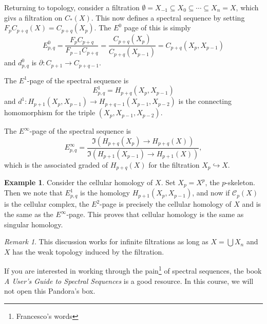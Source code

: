 \documentclass[leqno, openany]{memoir}
\theoremstyle{definition}
\newtheorem{exm}[thm]{Example}
\theoremstyle{remark}
\newtheorem{rmk}[thm]{Remark}
\theoremstyle{plain}
\theoremstyle{definition}
\theoremstyle{remark}
\newcommand{\mc}[1]{\mathcal{#1}}
\begin{document}
Returning to topology, consider a filtration $\emptyset = X_{-1} \subseteq X_0
\subseteq \cdots \subseteq X_n = X$, which givs a filtration on $C_*(X)$. This
now defines a spectral sequence by setting $F_p C_{p+q}(X) = C_{p+q}(X_p)$. The
$E^0$ page of this is simply \[ E_{p,q}^0 = \frac{F_p C_{p+q}}{F_{p-1} C_{p+q}}
= \frac{C_{p+q}(X_p)}{C_{p+q}(X_{p-1})} = C_{p+q}(X_p, X_{p-1}) \] and
$d_{p,q}^0$ is $\partial \colon C_{p+1} \to C_{p+q-1}$.

The $E^1$-page of the spectral sequence is \[ E^1_{p,q} = H_{p+q}(X_p,
X_{p-1})\] and $d^1 \colon H_{p+1}(X_p, X_{p-1}) \to H_{p+q-1}(X_{p-1},
X_{p-2})$ is the connecting homomorphism for the triple $(X_p, X_{p-1},
X_{p-2})$. 

The $E^{\infty}$-page of the spectral sequence is \[ E_{p,q}^{\infty} =
\frac{\Im(H_{p+q}(X_p) \to H_{p+q}(X))}{\Im(H_{p+1}(X_{p-1}) \to H_{p+1}(X))},
\] which is the associated graded of $H_{p+q}(X)$ for the filtration $X_p
\hookrightarrow X$.

\begin{exm} Consider the cellular homology of $X$. Set $X_p = X^p$, the
    $p$-skeleton. Then we note that $E_{p,q}^1$ is the homology $H_{p+1}(X_p,
    X_{p-1})$, and now if $\mc{C}_p(X)$ is the cellular complex, the $E^2$-page
    is precisely the cellular homology of $X$ and is the same as the
    $E^{\infty}$-page. This proves that cellular homology is the same as
    singular homology.  \end{exm}

\begin{rmk} This discussion works for infinite filtrations as long as $X =
\bigcup X_n$ and $X$ has the weak topology induced by the filtration.
\end{rmk}

If you are interested in working through the pain\footnote{Francesco's words}
of spectral sequences, the book \textit{A User's Guide to Spectral Sequences}
is a good resource. In this course, we will not open this Pandora's box.
\end{document}
